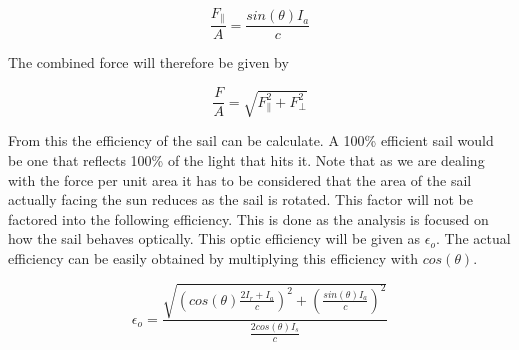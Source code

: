 \documentclass[14pt]{article}
\begin{document}
$$
  \frac{F_{\parallel}}{A} = \frac{ sin(\theta) I_{a} }{c}
$$

The combined force will therefore be given by

$$
\frac{F}{A} = \sqrt{F_{\parallel}^2 + F_{\perp}^2}
$$

From this the efficiency of the sail can be calculate. A 100\% efficient sail
would be one that reflects 100\% of the light that hits it. Note that as we
are dealing with the force per unit area it has to be considered that the area
of the sail actually facing the sun reduces as the sail is rotated. This factor
will not be factored into the following efficiency. This is done as the analysis
is focused on how the sail behaves optically. This optic efficiency will be given
as $\epsilon_{o}$. The actual efficiency can be easily obtained by multiplying
this efficiency with $cos(\theta)$.

$$
\epsilon_{o} = \frac{\sqrt{(cos(\theta) \frac{ 2  I_{r} + I_{a} }{c})^2 + (\frac{ sin(\theta) I_{a} }{c})^2}}{\frac{2 cos(\theta) I_s}{c}}
$$


\printbibliography
\end{document}
